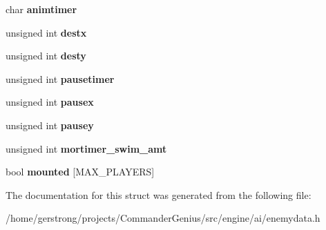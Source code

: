 \begin{DoxyCompactItemize}
\item 
\hypertarget{structst_nessie_data_a9a6d062635ac7c8b11be7549053d11da}{
char {\bfseries animtimer}}
\label{structst_nessie_data_a9a6d062635ac7c8b11be7549053d11da}

\item 
\hypertarget{structst_nessie_data_a54a234794e1144bf5fb2c354230930fa}{
unsigned int {\bfseries destx}}
\label{structst_nessie_data_a54a234794e1144bf5fb2c354230930fa}

\item 
\hypertarget{structst_nessie_data_a4117f8069ca9fe912005ada9d636fb06}{
unsigned int {\bfseries desty}}
\label{structst_nessie_data_a4117f8069ca9fe912005ada9d636fb06}

\item 
\hypertarget{structst_nessie_data_a565ae15fb410b071699a46c565648234}{
unsigned int {\bfseries pausetimer}}
\label{structst_nessie_data_a565ae15fb410b071699a46c565648234}

\item 
\hypertarget{structst_nessie_data_a6ed2994bb687950f9eaaa053f763b9ba}{
unsigned int {\bfseries pausex}}
\label{structst_nessie_data_a6ed2994bb687950f9eaaa053f763b9ba}

\item 
\hypertarget{structst_nessie_data_ac4f0e8824057b66014b0e7e341aadfa7}{
unsigned int {\bfseries pausey}}
\label{structst_nessie_data_ac4f0e8824057b66014b0e7e341aadfa7}

\item 
\hypertarget{structst_nessie_data_aca54ad400afc016b2889ecf8d9088e8d}{
unsigned int {\bfseries mortimer\_\-swim\_\-amt}}
\label{structst_nessie_data_aca54ad400afc016b2889ecf8d9088e8d}

\item 
\hypertarget{structst_nessie_data_a384c80766c21b39f417b4be21eadc574}{
bool {\bfseries mounted} \mbox{[}MAX\_\-PLAYERS\mbox{]}}
\label{structst_nessie_data_a384c80766c21b39f417b4be21eadc574}

\end{DoxyCompactItemize}


The documentation for this struct was generated from the following file:\begin{DoxyCompactItemize}
\item 
/home/gerstrong/projects/CommanderGenius/src/engine/ai/enemydata.h\end{DoxyCompactItemize}
